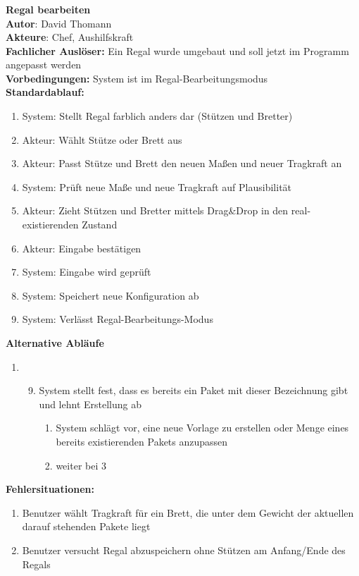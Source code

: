 \subsubsection*{}
\textbf{Regal bearbeiten}\bigskip\\
\textbf{Autor}: David Thomann\\
\textbf{Akteure}: Chef, Aushilfskraft\\
\textbf{Fachlicher Auslöser:} Ein Regal wurde umgebaut und soll jetzt im Programm angepasst werden\\
\textbf{Vorbedingungen: }System ist im Regal-Bearbeitungsmodus\\
\textbf{Standardablauf:}
\begin{enumerate}
    \item System: Stellt Regal farblich anders dar (Stützen und Bretter) 
    \item Akteur: Wählt Stütze oder Brett aus
    \item Akteur: Passt Stütze und Brett den neuen Maßen und neuer Tragkraft an
    \item System: Prüft neue Maße und neue Tragkraft auf Plausibilität
    \item Akteur: Zieht Stützen und Bretter mittels Drag\&Drop in den real-existierenden Zustand
    \item Akteur: Eingabe bestätigen
    \item System: Eingabe wird geprüft
    \item System: Speichert neue Konfiguration ab
    \item System: Verlässt Regal-Bearbeitungs-Modus
\end{enumerate}
\textbf{Alternative Abläufe}
\begin{enumerate}
    \item[] \begin{enumerate}\setcounter{enumi}{8}
\item System stellt fest, dass es bereits ein Paket mit dieser Bezeichnung gibt und lehnt Erstellung ab
    \begin{enumerate}
    \item System schlägt vor, eine neue Vorlage zu erstellen oder Menge eines bereits existierenden Pakets anzupassen
    \item weiter bei 3
\end{enumerate}
\end{enumerate}
\end{enumerate}
\textbf{Fehlersituationen:}
\begin{enumerate}
    \item Benutzer wählt Tragkraft für ein Brett, die unter dem Gewicht der aktuellen darauf stehenden Pakete liegt
    \item Benutzer versucht Regal abzuspeichern ohne Stützen am Anfang/Ende des Regals
\end{enumerate}

